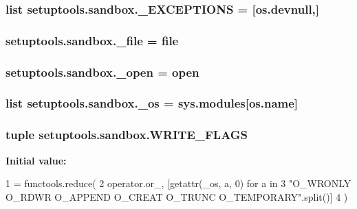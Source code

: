 \subsubsection[{\+\_\+\+E\+X\+C\+E\+P\+T\+I\+O\+N\+S}]{\setlength{\rightskip}{0pt plus 5cm}list setuptools.\+sandbox.\+\_\+\+E\+X\+C\+E\+P\+T\+I\+O\+N\+S = \mbox{[}os.\+devnull,\mbox{]}}\label{namespacesetuptools_1_1sandbox_aa68adb36abe8accb61bfff7f33e49462}
\hypertarget{namespacesetuptools_1_1sandbox_a606d2df05a9166bff220807da3b98823}{}
\subsubsection[{\+\_\+file}]{\setlength{\rightskip}{0pt plus 5cm}setuptools.\+sandbox.\+\_\+file = file}\label{namespacesetuptools_1_1sandbox_a606d2df05a9166bff220807da3b98823}
\hypertarget{namespacesetuptools_1_1sandbox_a616fa17a666518a02267233ecdc9df33}{}
\subsubsection[{\+\_\+open}]{\setlength{\rightskip}{0pt plus 5cm}setuptools.\+sandbox.\+\_\+open = open}\label{namespacesetuptools_1_1sandbox_a616fa17a666518a02267233ecdc9df33}
\hypertarget{namespacesetuptools_1_1sandbox_a63c511133e8c157ec2dbefeac87a0f85}{}
\subsubsection[{\+\_\+os}]{\setlength{\rightskip}{0pt plus 5cm}list setuptools.\+sandbox.\+\_\+os = sys.\+modules\mbox{[}os.\+name\mbox{]}}\label{namespacesetuptools_1_1sandbox_a63c511133e8c157ec2dbefeac87a0f85}
\hypertarget{namespacesetuptools_1_1sandbox_addf2b2626fe8f6ada55604935edd0f24}{}
\subsubsection[{W\+R\+I\+T\+E\+\_\+\+F\+L\+A\+G\+S}]{\setlength{\rightskip}{0pt plus 5cm}tuple setuptools.\+sandbox.\+W\+R\+I\+T\+E\+\_\+\+F\+L\+A\+G\+S}\label{namespacesetuptools_1_1sandbox_addf2b2626fe8f6ada55604935edd0f24}
{\bfseries Initial value\+:}
\begin{DoxyCode}
1 = functools.reduce(
2     operator.or\_, [getattr(\_os, a, 0) \textcolor{keywordflow}{for} a \textcolor{keywordflow}{in}
3         \textcolor{stringliteral}{"O\_WRONLY O\_RDWR O\_APPEND O\_CREAT O\_TRUNC O\_TEMPORARY"}.split()]
4 )
\end{DoxyCode}
